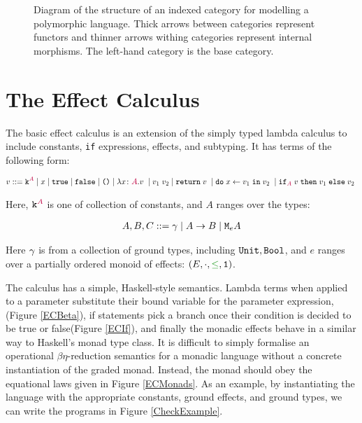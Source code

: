 \begin{figure}[ht!]
{
    }
    
    \caption{Diagram of the structure of an indexed category for modelling a polymorphic language. Thick arrows between categories represent functors and thinner arrows withing categories represent internal morphisms. The left-hand category is the base category.
    }
    \label{IndexDiagram}
\end{figure}


\section{The Effect Calculus}
\label{ECDefinition}
The basic effect calculus is an extension of the simply typed lambda calculus to include constants, \texttt{if} expressions, effects, and subtyping. It has terms of the following form:

\begin{align*}
    v ::= \texttt{k}^{\color{purple} A} \mid x\mid \texttt{true} \mid\texttt{false} \mid\texttt{()}\mid\lambda x \colon {\color{purple}A}. v\;\mid v_1\; v_2\mid\texttt{return} \; v\;\mid\texttt{do}\; x \leftarrow v_1 \;\texttt{in}\; v_2\;\mid\texttt{if}_{\textcolor{purple}{A}}\; v\; \texttt{then}\; v_1 \;\texttt{else} \; v_2\; 
\end{align*}

Here, $\texttt{k}^{\color{purple} A}$ is one of collection of constants, and $A$ ranges over the types:

\begin{align*}
    A, B, C ::= \gamma\mid A\rightarrow B \mid\texttt{M}_{e}{A}
\end{align*}

Here $\gamma$ is from a collection of ground types, including $\texttt{Unit}, \texttt{Bool}$, and $e$ ranges over a partially ordered monoid of effects: $(E, \dot, \subeffect, \1)$.

The calculus has a simple, Haskell-style semantics. Lambda terms when applied to a parameter substitute their bound variable for the parameter expression, (Figure \ref{ECBeta}), if statements pick a branch once their condition is decided to be true or false(Figure \ref{ECIf}), and finally the monadic effects behave in a similar way to Haskell's monad type class. It is difficult to simply formalise an operational $\beta\eta$-reduction semantics for a monadic language without a concrete instantiation of the graded monad. Instead, the monad should obey the equational laws given in Figure \ref{ECMonads}. As an example, by instantiating the language with the appropriate constants, ground effects, and ground types, we can write the programs in Figure \ref{CheckExample}.



